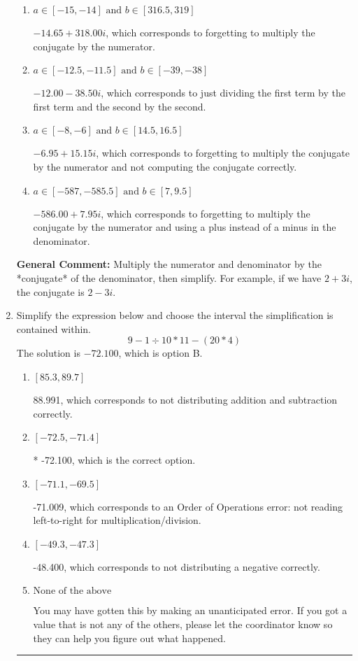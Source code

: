 \documentclass{extbook}[14pt]
\newcommand{\litem}[1]{\item #1

\rule{\textwidth}{0.4pt}}
\begin{document}
\begin{enumerate}
{\begin{enumerate}[label=\Alph*.]
* $-14.65  + 7.95 i$, which is the correct option.
\item \( a \in [-15, -14] \text{ and } b \in [316.5, 319] \)

 $-14.65  + 318.00 i$, which corresponds to forgetting to multiply the conjugate by the numerator.
\item \( a \in [-12.5, -11.5] \text{ and } b \in [-39, -38] \)

 $-12.00  - 38.50 i$, which corresponds to just dividing the first term by the first term and the second by the second.
\item \( a \in [-8, -6] \text{ and } b \in [14.5, 16.5] \)

 $-6.95  + 15.15 i$, which corresponds to forgetting to multiply the conjugate by the numerator and not computing the conjugate correctly.
\item \( a \in [-587, -585.5] \text{ and } b \in [7, 9.5] \)

 $-586.00  + 7.95 i$, which corresponds to forgetting to multiply the conjugate by the numerator and using a plus instead of a minus in the denominator.
\end{enumerate}

\textbf{General Comment:} Multiply the numerator and denominator by the *conjugate* of the denominator, then simplify. For example, if we have $2+3i$, the conjugate is $2-3i$.
}
\litem{
Simplify the expression below and choose the interval the simplification is contained within.
\[ 9 - 1 \div 10 * 11 - (20 * 4) \]The solution is \( -72.100 \), which is option B.\begin{enumerate}[label=\Alph*.]
\item \( [85.3, 89.7] \)

 88.991, which corresponds to not distributing addition and subtraction correctly.
\item \( [-72.5, -71.4] \)

* -72.100, which is the correct option.
\item \( [-71.1, -69.5] \)

 -71.009, which corresponds to an Order of Operations error: not reading left-to-right for multiplication/division.
\item \( [-49.3, -47.3] \)

 -48.400, which corresponds to not distributing a negative correctly.
\item \( \text{None of the above} \)

 You may have gotten this by making an unanticipated error. If you got a value that is not any of the others, please let the coordinator know so they can help you figure out what happened.
\end{enumerate}

}
\end{enumerate}
\end{document}
